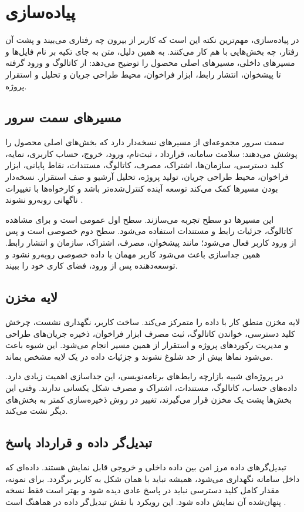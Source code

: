 \chapter{پیاده‌سازی}

در پیاده‌سازی، مهم‌ترین نکته این است که کاربر از بیرون چه رفتاری می‌بیند و پشت آن رفتار، چه بخش‌هایی با هم کار می‌کنند. به همین دلیل، متن به جای تکیه بر نام فایل‌ها و مسیرهای داخلی، مسیرهای اصلی محصول را توضیح می‌دهد: از کاتالوگ و ورود گرفته تا پیشخوان، انتشار رابط، ابزار فراخوان، محیط طراحی جریان و تحلیل و استقرار پروژه.

\section{مسیرهای سمت سرور}
سمت سرور مجموعه‌ای از مسیرهای نسخه‌دار دارد که بخش‌های اصلی محصول را پوشش می‌دهند: سلامت سامانه، قرارداد ، ثبت‌نام، ورود، خروج، حساب کاربری، نمایه، کلید دسترسی، سازمان‌ها، اشتراک، مصرف، کاتالوگ، مستندات، نقاط پایانی، ابزار فراخوان، محیط طراحی جریان، تولید پروژه، تحلیل آرشیو و صف استقرار. نسخه‌دار بودن مسیرها کمک می‌کند توسعه آینده کنترل‌شده‌تر باشد و کارخواه‌ها با تغییرات ناگهانی روبه‌رو نشوند \cite{drf,openapi}.

این مسیرها دو سطح تجربه می‌سازند. سطح اول عمومی است و برای مشاهده کاتالوگ، جزئیات رابط و مستندات استفاده می‌شود. سطح دوم خصوصی است و پس از ورود کاربر فعال می‌شود؛ مانند پیشخوان، مصرف، اشتراک، سازمان و انتشار رابط. همین جداسازی باعث می‌شود کاربر مهمان با داده خصوصی روبه‌رو نشود و توسعه‌دهنده پس از ورود، فضای کاری خود را ببیند.

\section{لایه مخزن}
لایه مخزن منطق کار با داده را متمرکز می‌کند. ساخت کاربر، نگهداری نشست، چرخش کلید دسترسی، خواندن کاتالوگ، ثبت مصرف ابزار فراخوان، ذخیره جریان‌های طراحی و مدیریت رکوردهای پروژه و استقرار از همین مسیر انجام می‌شود. این شیوه باعث می‌شود نماها بیش از حد شلوغ نشوند و جزئیات داده در یک لایه مشخص بماند.

در پروژه‌ای شبیه بازارچه رابط‌های برنامه‌نویسی، این جداسازی اهمیت زیادی دارد. داده‌های حساب، کاتالوگ، مستندات، اشتراک و مصرف شکل یکسانی ندارند. وقتی این بخش‌ها پشت یک مخزن قرار می‌گیرند، تغییر در روش ذخیره‌سازی کمتر به بخش‌های دیگر نشت می‌کند.

\section{تبدیل‌گر داده و قرارداد پاسخ}
تبدیل‌گرهای داده مرز امن بین داده داخلی و خروجی قابل نمایش هستند. داده‌ای که داخل سامانه نگهداری می‌شود، همیشه نباید با همان شکل به کاربر برگردد. برای نمونه، مقدار کامل کلید دسترسی نباید در پاسخ عادی دیده شود و بهتر است فقط نسخه پنهان‌شده آن نمایش داده شود. این رویکرد با نقش تبدیل‌گر داده در  هماهنگ است \cite{drf}.

